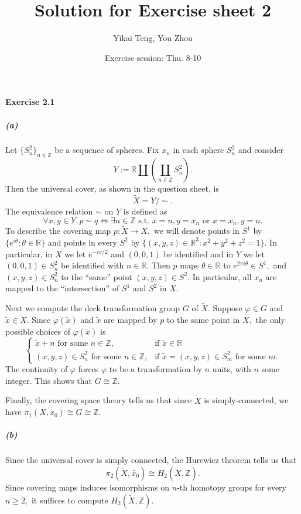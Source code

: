 \documentclass{article}
\title{Solution for Exercise sheet 2}
\author{Yikai Teng, You Zhou}
\date{Exercise session: Thu. 8-10}
\begin{document}
\maketitle

\paragraph{Exercise 2.1}
\subparagraph{(a)}Let $\{S_n^2\}_{n\in\mathbb{Z}}$ be a sequence of spheres. Fix $x_n$ in each sphere $S_n^2$ and consider
\[Y:=\mathbb{R}\coprod\left(\coprod_{n\in\mathbb{Z}}S_n^{2}\right).\]
Then the universal cover, as shown in the question sheet, is
\[\widetilde{X}=Y/\sim.\]
The equivalence relation $\sim$ on $Y$ is defined as
\[\forall x,y\in Y, p\sim q\Leftrightarrow\exists n\in\mathbb{Z} \text{ s.t. } x=n, y=x_n\text{ or }x=x_n, y=n.\]
To describe the covering map $p\colon\widetilde{X}\rightarrow X,$ we will denote points in $S^1$ by $\{e^{i\theta}:\theta\in\mathbb{R}\}$ and points in every $S^2$ by $\{(x,y,z)\in\mathbb{R}^3:x^2+y^2+z^2=1\}.$ In particular, in $X$ we let $e^{-i\pi/2}$ and $(0,0,1)$ be identified and in $Y$ we let $(0,0,1)\in S_n^2$ be identified with $n\in\mathbb{R}.$ Then $p$ maps $\theta\in\mathbb{R}$ to $e^{2\pi i\theta}\in S^1,$ and $(x,y,z)\in S_n^2$ to the ``same'' point $(x,y,z)\in S^2.$ In particular, all $x_n$ are mapped to the ``intersection'' of $S^1$ and $S^2$ in $X.$

Next we compute the deck transformation group $G$ of $\widetilde{X}.$ Suppose $\varphi\in G$ and $\tilde{x}\in\widetilde{X}.$ Since $\varphi(\tilde{x})$ and $\tilde{x}$ are mapped by $p$ to the same point in $X,$ the only possible choices of $\varphi(\tilde{x})$ is
\[\begin{cases}
  \tilde{x}+n \text{ for some }n\in\mathbb{Z}, & \mbox{if } \tilde{x}\in\mathbb{R} \\
  (x,y,z)\in S_n^2\text{ for some }n\in\mathbb{Z}, & \mbox{if } \tilde{x}=(x,y,z)\in S_m^2\text{ for some }m.
\end{cases}\]
The continuity of $\varphi$ forces $\varphi$ to be a transformation by $n$ units, with $n$ some integer. This shows that $G\cong\mathbb{Z}.$

Finally, the covering space theory tells us that since $\widetilde{X}$ is simply-connected, we have $\pi_1(X,x_0)\cong G\cong\mathbb{Z}.$

\subparagraph{(b)}
Since the universal cover is simply connected, the Hurewicz theorem tells us that
\[\pi_2(\widetilde{X},\tilde{x_0})\cong H_2(\widetilde{X},\mathbb{Z}).\]
Since covering maps induces isomorphisms on $n$-th homotopy groups for every $n\geq2,$ it suffices to compute $H_2(\widetilde{X},\mathbb{Z}).$
\end{document}

